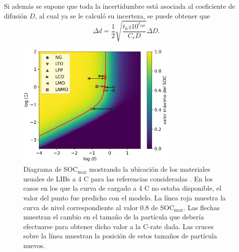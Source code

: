 Si además se supone que toda la incertidumbre está asociada al coeficiente de 
difusión $D$, al cual ya se le calculó su incerteza, se puede obtener que
\begin{equation}
    \Delta d = \frac{1}{2} \sqrt{\frac{t_h z 10^{\ell_{\text{opt}}}}{C_r D}} \Delta D.
\end{equation}
\begin{figure}[h!]
    \centering
    \includegraphics[width=0.7\textwidth]{FastCharging/un/resultados/prediccion/prediccion.png}
    \caption{Diagrama de SOC$_{\max}$ mostrando la ubicación de los materiales 
    usuales de LIBs a 4 C para las referencias consideradas \cite{mancini2022,
    he2012, lei2015, wang2019high, bak2011, nishikawa2017}. En los casos en los 
    que la curva de cargado a 4 C no estaba disponible, el valor del punto fue 
    predicho con el modelo. La línea roja muestra la curva de nivel 
    correspondiente al valor 0.8 de SOC$_{\max}$. Las flechas muestran el cambio
    en el tamaño de la partícula que debería efectuarse para obtener dicho valor
    a la C-rate dada. Las cruces sobre la línea muestran la posición de estos
    tamaños de partícula nuevos.}
    \label{fig:prediccion}
\end{figure}


